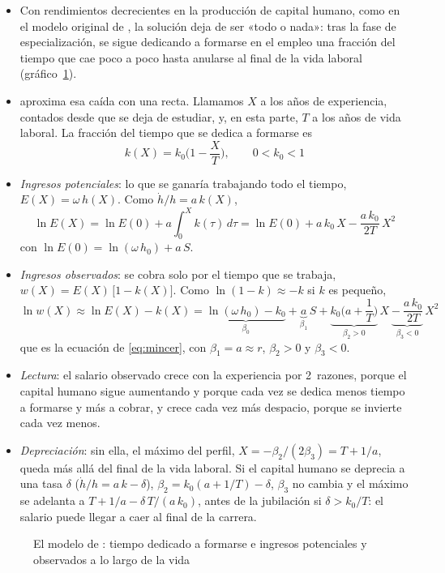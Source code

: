 \documentclass[11pt]{article}
\begin{document}
\begin{itemize}
\item Con rendimientos decrecientes en la producción de capital humano, como en el modelo original de \textcite{BenPorath1967Production}, la solución deja de ser «todo o nada»: tras la fase de especialización, se sigue dedicando a formarse en el empleo una fracción del tiempo que cae poco a poco hasta anularse al final de la vida laboral (gráfico~\ref{fig:ben-porath}).
\item \textcite{Mincer1974Schooling} aproxima esa caída con una recta. Llamamos $X$ a los años de experiencia, contados desde que se deja de estudiar, y, en esta parte, $T$ a los años de vida laboral. La fracción del tiempo que se dedica a formarse es
  \[
  k(X)=k_0\Big(1-\frac{X}{T}\Big),\qquad 0<k_0<1
  \]
\item \emph{Ingresos potenciales}: lo que se ganaría trabajando todo el tiempo, $E(X)=\omega\,h(X)$. Como $\dot h/h=a\,k(X)$,
  \[
  \ln E(X)=\ln E(0)+a\int_{0}^{X}k(\tau)\,d\tau=\ln E(0)+a\,k_0\,X-\frac{a\,k_0}{2T}\,X^2
  \]
  con $\ln E(0)=\ln(\omega\,h_0)+a\,S$.
\item \emph{Ingresos observados}: se cobra solo por el tiempo que se trabaja, $w(X)=E(X)\,\big[1-k(X)\big]$. Como $\ln(1-k)\approx -k$ si $k$ es pequeño,
  \[
  \ln w(X)\approx\ln E(X)-k(X)=\underbrace{\ln(\omega\,h_0)-k_0}_{\beta_0}+\underbrace{a}_{\beta_1}\,S+\underbrace{k_0\Big(a+\frac{1}{T}\Big)}_{\beta_2>0}\,X\ \underbrace{-\ \frac{a\,k_0}{2T}}_{\beta_3<0}\,X^2
  \]
  que es la ecuación de  \eqref{eq:mincer}, con $\beta_1=a\approx r$, $\beta_2>0$ y $\beta_3<0$.\findemo
\item \emph{Lectura}: el salario observado crece con la experiencia por 2~razones, porque el capital humano sigue aumentando y porque cada vez se dedica menos tiempo a formarse y más a cobrar, y crece cada vez más despacio, porque se invierte cada vez menos.
\item \emph{Depreciación}: sin ella, el máximo del perfil, $X=-\beta_2/(2\beta_3)=T+1/a$, queda más allá del final de la vida laboral. Si el capital humano se deprecia a una tasa $\delta$ ($\dot h/h=a\,k-\delta$), $\beta_2=k_0(a+1/T)-\delta$, $\beta_3$ no cambia y el máximo se adelanta a $T+1/a-\delta\,T/(a\,k_0)$, antes de la jubilación si $\delta>k_0/T$: el salario puede llegar a caer al final de la carrera.
\end{itemize}

\begin{figure}[H]
\centering
\caption{El modelo de : tiempo dedicado a formarse e ingresos potenciales y observados a lo largo de la vida}\label{fig:ben-porath}
\end{figure}
\end{document}
